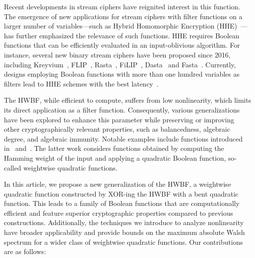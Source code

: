 \documentclass[runningheads,orivec]{llncs}
\newcommand{\hwbf}{\textsf{HWBF}}
\begin{document}
    Recent developments in stream ciphers have reignited interest in this function. The emergence of new applications for stream ciphers with filter functions on a larger number of variables—such as Hybrid Homomorphic Encryption (\textsf{HHE})~\cite{CCS:NaeLauVai11}—has further emphasized the relevance of such functions. \textsf{HHE} requires Boolean functions that can be efficiently evaluated in an input-oblivious algorithm. For instance, several new binary stream ciphers have been proposed since 2016, including Kreyvium~\cite{JOC:CCFLNP18}, \textsf{FLIP}~\cite{EC:MJSC16}, Rasta~\cite{C:Rasta}, \textsf{FiLIP}~\cite{INDO:MCJS19}, Dasta~\cite{TOSC:BeiLea20} and Fasta~\cite{CTRSA:CidIndRad22}. Currently, designs employing Boolean functions with more than one hundred variables as filters lead to \textsf{HHE} schemes with the best latency~\cite{eprint:AGHM24,CCS:CDPP22,INDO:HofMeaRic20,CIC:MeaParPei24}.
    
    The \hwbf{}, while efficient to compute, suffers from low nonlinearity, which limits its direct application as a filter function. Consequently, various generalizations have been explored to enhance this parameter while preserving or improving other cryptographically relevant properties, such as balancedness, algebraic degree, and algebraic immunity. Notable examples include functions introduced in~\cite{IEEE:Carlet22,eprint:CarPar23} and~\cite{DAM:MeaOza24}. The latter work considers functions obtained by computing the Hamming weight of the input and applying a quadratic Boolean function, so-called weightwise quadratic functions.
    
    \bigskip
    
    In this article, we propose a new generalization of the \hwbf{}, a weightwise quadratic function constructed by \textsf{XOR}-ing the \hwbf{} with a bent quadratic function. This leads to a family of Boolean functions that are computationally efficient and feature superior cryptographic properties compared to previous constructions. Additionally, the techniques we introduce to analyze nonlinearity have broader applicability and provide bounds on the maximum absolute Walsh spectrum for a wider class of weightwise quadratic functions. Our contributions are as follows:
    
\end{document}
